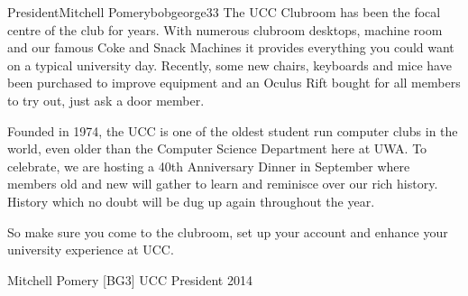 \begin{welcome}{President}{Mitchell Pomery}{bobgeorge33}
The UCC Clubroom has been the focal centre of the club for years.
With numerous clubroom desktops, machine room and our famous Coke and Snack Machines it provides everything you could want on a typical university day.
Recently, some new chairs, keyboards and mice have been purchased to improve equipment and an Oculus Rift bought for all members to try out, just ask a door member.

Founded in 1974, the UCC is one of the oldest student run computer clubs in the world, even older than the Computer Science Department here at UWA.
To celebrate, we are hosting a 40th Anniversary Dinner in September where members old and new will gather to learn and reminisce over our rich history.
History which no doubt will be dug up again throughout the year.

So make sure you come to the clubroom, set up your account and enhance your university experience at UCC.

Mitchell Pomery [BG3]
UCC President 2014
\end{welcome}






